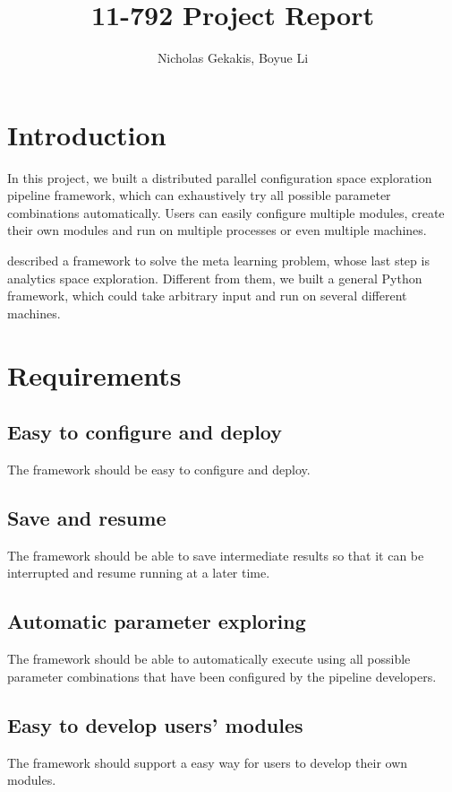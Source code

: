 \documentclass{article}
\begin{document}
\title{11-792 Project Report}

\author{Nicholas Gekakis, Boyue Li}

\maketitle

\section{Introduction}

In this project, we built a distributed parallel configuration space exploration pipeline framework,
which can exhaustively try all possible parameter combinations automatically.
Users can easily configure multiple modules,
create their own modules and run on multiple processes or even multiple machines.

\cite{yang2016analytics} described a framework to solve the meta learning problem,
whose last step is analytics space exploration.
Different from them, we built a general Python framework, which could take arbitrary input and run on several different machines.

\section{Requirements}

    \subsection{Easy to configure and deploy}
    The framework should be easy to configure and deploy.

    \subsection{Save and resume}
    The framework should be able to save intermediate results so that it can be interrupted and resume running at a later time.

    \subsection{Automatic parameter exploring}
    The framework should be able to automatically execute using all possible parameter combinations that have been configured by the pipeline developers.

    \subsection{Easy to develop users' modules}
    The framework should support a easy way for users to develop their own modules.
\end{document}
